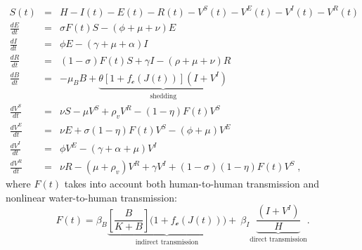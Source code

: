 \begingroup
\allowdisplaybreaks
\begin{eqnarray} \label{eq:fullmodel}
S(t) &=& H - I(t) - E(t) - R(t) - V^S(t) - V^E(t) - V^I(t) - V^R(t) \label{eq:S2j} \\
 \frac{dE}{dt} &=& \sigma F(t) S - (\phi + \mu +\nu) E \label{eq:E2j}\\
 \frac{dI}{dt} &=& \phi E - (\gamma + \mu + \alpha) I \label{eq:I2j}\\
 \frac{dR}{dt} &=& (1-\sigma) F(t) S + \gamma I - (\rho + \mu+\nu) R \label{eq:R2j}\\
 \frac{dB}{dt} &=& - \mu_B B +\underbrace{\theta\left[1 + f_{\mathcal{c}}\left(J(t)\right) \right] (I+V^I)}_{\text{shedding}} \label{eq:B2}\\
\frac{dV^S}{dt} &=& \nu S - \mu V^S+ \rho_{v} V^R - (1-\eta) F(t) V^S \label{eq:VS2j}\\
 \frac{dV^E}{dt} &=& \nu E + \sigma (1-\eta) F(t) V^S-(\phi + \mu) V^E \label{eq:VE2}\\
 \frac{dV^I}{dt} &=&  \phi V^E -(\gamma + \alpha + \mu) V^I \label{eq:VI2j}\\
 \frac{dV^R}{dt} &=& \nu R -(\mu +\rho_{v})V^R +\gamma V^I +(1-\sigma) (1-\eta) F(t) V^S\label{eq:VR2j}\; ,
\end{eqnarray}
\endgroup
where $F(t)$ takes into account both human-to-human transmission and nonlinear water-to-human transmission:
\begin{equation}
  F(t) = \beta_B \underbrace{ \left[\frac{B}{K + B} \right] \bigg(1+f_{\mathcal{e}}\left(J(t)\right)\bigg)}_{\text{indirect transmission}} + ~\beta_{I} \underbrace{\frac{(I+V^I)}{H}}_{\text{direct transmission}}.
\label{eq:force2}
\end{equation}


